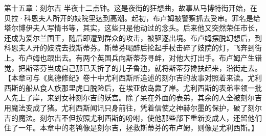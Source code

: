\par 第十五章：刻尔吉 半夜十二点钟。这是夜街的狂想曲，故事从马博特街开始，在贝拉·科恩夫人所开的妓院里达到高潮。起初，布卢姆被警察抓去受审。罪名是给塔尔博伊夫人写情书等，其实，这些只是他动过的念头。后来他又突然荣任市长，还成为爱尔兰国王，随后即遭到群众的攻击，被驱逐出境。布卢姆摆脱幻想后，到科恩夫人开的妓院去找斯蒂芬。斯蒂芬喝醉后抡起手杖击碎了妓院的灯，飞奔到街上。布卢姆也跟出去。有两个英国兵向斯蒂芬寻衅，对他大打出手。布卢姆产生错觉，把斯蒂芬当成自己那已夭折了的儿子鲁迪，就将斯蒂芬搀扶起来，沿街走去。【本章可与《奥德修纪》卷十中尤利西斯所追述的刻尔吉的故事对照着来读。尤利西斯的船从食人族那里虎口脱险后，在埃亚依岛靠了岸。尤利西斯的表弟率领一批人先上了岸，来到女神刻尔吉的妖宫。除了呆在外面的表弟，其余的人全被刻尔吉用魔法变成了猪。尤利西斯闻讯只身前往，凭着信使之神赫尔墨的保护，破了刻尔吉的魔法。刻尔吉不但按照尤利西斯的吩咐，使他那些部下重新变成人，还留他们住了一年。本章中的老鸨像是刻尔吉，拯救斯蒂芬的布卢姆，则像是尤利西斯。】

